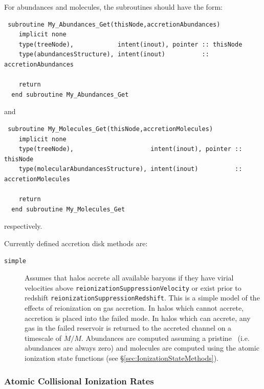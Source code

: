 For abundances and molecules, the subroutines should have the form:
\begin{verbatim}
 subroutine My_Abundances_Get(thisNode,accretionAbundances)
    implicit none
    type(treeNode),            intent(inout), pointer :: thisNode
    type(abundancesStructure), intent(inout)          :: accretionAbundances

    return
  end subroutine My_Abundances_Get
\end{verbatim}
and
\begin{verbatim}
 subroutine My_Molecules_Get(thisNode,accretionMolecules)
    implicit none
    type(treeNode),                     intent(inout), pointer :: thisNode
    type(molecularAbundancesStructure), intent(inout)          :: accretionMolecules

    return
  end subroutine My_Molecules_Get
\end{verbatim}
respectively.

Currently defined accretion disk methods are:
\begin{description}
 \item [{\tt simple}] Assumes that halos accrete all available baryons if they have virial velocities above {\tt reionizationSuppressionVelocity} or exist prior to redshift {\tt reionizationSuppressionRedshift}. This is a simple model of the effects of reionization on gas accretion. In halos which cannot accrete, accretion is placed into the failed mode. In halos which can accrete, any gas in the failed reservoir is returned to the accreted channel on a timescale of $\dot{M}/M$. Abundances are computed assuming a pristine \IGM\ (i.e. abundances are always zero) and molecules are computed using the atomic ionization state functions (see \S\ref{sec:IonizationStateMethods}).
\end{description}

\subsubsection{Atomic Collisional Ionization Rates}

